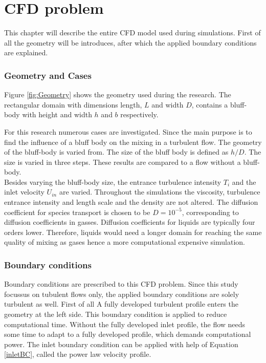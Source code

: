 \documentclass{CFD2017}
\begin{document}
\section{CFD problem}
This chapter will describe the entire CFD model used during simulations. First of all the geometry will be introduces, after which the applied boundary conditions are explained.

\subsubsection{Geometry and Cases}
Figure \ref{fig:Geometry} shows the geometry used during the research. The rectangular domain with dimensions length, $L$ and width $D$, contains a bluff-body with height and width $h$ and $b$ respectively.


For this research numerous cases are investigated. Since the main purpose is to find the influence of a bluff body on the mixing in a turbulent flow. The geometry of the bluff-body is varied from. The size of the bluff body is defined as $h/D$. The size is varied in three steps. These results are compared to a flow without a bluff-body.\\
Besides varying the bluff-body size, the entrance turbulence intensity $T_i$ and the inlet velocity $U_{in}$ are varied. 
Throughout the simulations the viscosity, turbulence entrance intensity and length scale and the density are not altered. The diffusion coefficient for species transport is chosen to be $D=10^{-5}$, corresponding to diffusion coefficients in gasses. Diffusion coefficients for liquids are typically four orders lower. Therefore, liquids would need a longer domain for reaching the same quality of mixing as gases hence a more computational expensive simulation. 


\subsubsection{Boundary conditions}
Boundary conditions are prescribed to this CFD problem. Since this study focussus on tubulent flows only, the applied boundary conditions are solely turbulent as well. First of all A fully developed turbulent profile enters the geometry at the left side. This boundary condition is applied to reduce computational time. Without the fully developed inlet profile, the flow needs some time to adapt to a fully developed profile, which demands computational power. The inlet boundary condition can be applied with help of Equation \ref{inletBC}, called the power law velocity profile. \vspace{2mm}
\end{document}
